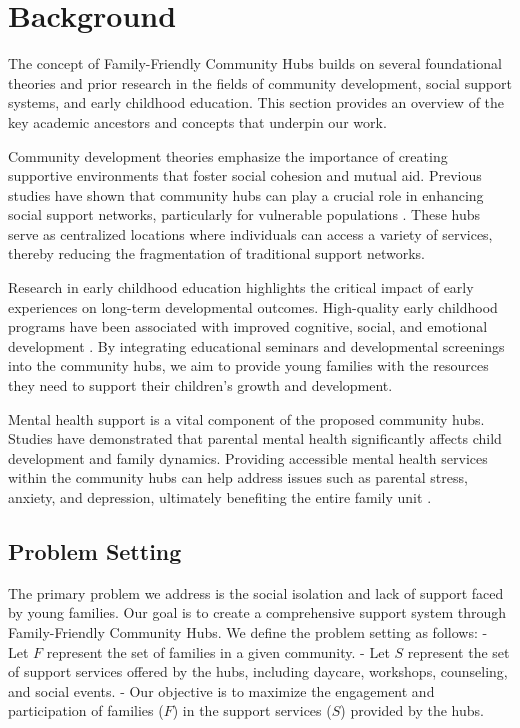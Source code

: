\documentclass{article} %
\begin{document}
\section{Background}
\label{sec:background}
The concept of Family-Friendly Community Hubs builds on several foundational theories and prior research in the fields of community development, social support systems, and early childhood education. This section provides an overview of the key academic ancestors and concepts that underpin our work.

Community development theories emphasize the importance of creating supportive environments that foster social cohesion and mutual aid. Previous studies have shown that community hubs can play a crucial role in enhancing social support networks, particularly for vulnerable populations \citep{zhou2023peer}. These hubs serve as centralized locations where individuals can access a variety of services, thereby reducing the fragmentation of traditional support networks.

Research in early childhood education highlights the critical impact of early experiences on long-term developmental outcomes. High-quality early childhood programs have been associated with improved cognitive, social, and emotional development \citep{west2023agent}. By integrating educational seminars and developmental screenings into the community hubs, we aim to provide young families with the resources they need to support their children's growth and development.

Mental health support is a vital component of the proposed community hubs. Studies have demonstrated that parental mental health significantly affects child development and family dynamics. Providing accessible mental health services within the community hubs can help address issues such as parental stress, anxiety, and depression, ultimately benefiting the entire family unit \citep{poledna2023economic}.

\subsection{Problem Setting}
The primary problem we address is the social isolation and lack of support faced by young families. Our goal is to create a comprehensive support system through Family-Friendly Community Hubs. We define the problem setting as follows:
- Let \( F \) represent the set of families in a given community.
- Let \( S \) represent the set of support services offered by the hubs, including daycare, workshops, counseling, and social events.
- Our objective is to maximize the engagement and participation of families (\( F \)) in the support services (\( S \)) provided by the hubs.
\end{document}
